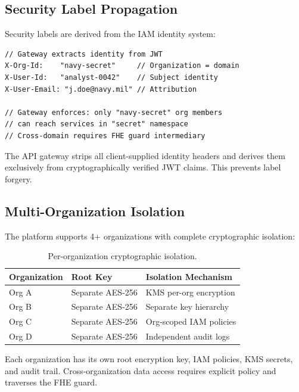 \documentclass[11pt,letterpaper]{article}
\begin{document}
\subsection{Security Label Propagation}

Security labels are derived from the IAM identity system:

\begin{lstlisting}[caption={Security label derivation from JWT claims.}]
// Gateway extracts identity from JWT
X-Org-Id:    "navy-secret"     // Organization = domain
X-User-Id:   "analyst-0042"    // Subject identity
X-User-Email: "j.doe@navy.mil" // Attribution

// Gateway enforces: only "navy-secret" org members
// can reach services in "secret" namespace
// Cross-domain requires FHE guard intermediary
\end{lstlisting}

The API gateway strips all client-supplied identity headers and derives them exclusively from cryptographically verified JWT claims. This prevents label forgery.

\subsection{Multi-Organization Isolation}

The platform supports 4+ organizations with complete cryptographic isolation:

\begin{table}[H]
\centering
\begin{tabular}{@{}llp{5cm}@{}}
\toprule
\textbf{Organization} & \textbf{Root Key} & \textbf{Isolation Mechanism} \\
\midrule
Org A & Separate AES-256 & KMS per-org encryption \\
Org B & Separate AES-256 & Separate key hierarchy \\
Org C & Separate AES-256 & Org-scoped IAM policies \\
Org D & Separate AES-256 & Independent audit logs \\
\bottomrule
\end{tabular}
\caption{Per-organization cryptographic isolation.}
\label{tab:org-isolation}
\end{table}

Each organization has its own root encryption key, IAM policies, KMS secrets, and audit trail. Cross-organization data access requires explicit policy and traverses the FHE guard.

\end{document}

